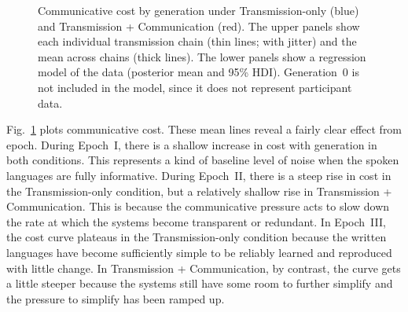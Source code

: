 \documentclass[doc,biblatex]{apa7}
\begin{document}
	\begin{figure}
	\vspace*{2pt}
	\caption{Communicative cost by generation under Transmission-only (blue) and Transmission + Communication (red). The upper panels show each individual transmission chain (thin lines; with jitter) and the mean across chains (thick lines). The lower panels show a regression model of the data (posterior mean and 95\% HDI). Generation~0 is not included in the model, since it does not represent participant data.}
	\label{cost_con}
	\end{figure}

Fig.~\ref{cost_con} plots communicative cost. These mean lines reveal a fairly clear effect from epoch. During Epoch~I, there is a shallow increase in cost with generation in both conditions. This represents a kind of baseline level of noise when the spoken languages are fully informative. During Epoch~II, there is a steep rise in cost in the Transmission-only condition, but a relatively shallow rise in Transmission + Communication. This is because the communicative pressure acts to slow down the rate at which the systems become transparent or redundant. In Epoch~III, the cost curve plateaus in the Transmission-only condition because the written languages have become sufficiently simple to be reliably learned and reproduced with little change. In Transmission + Communication, by contrast, the curve gets a little steeper because the systems still have some room to further simplify and the pressure to simplify has been ramped up.
\end{document}
